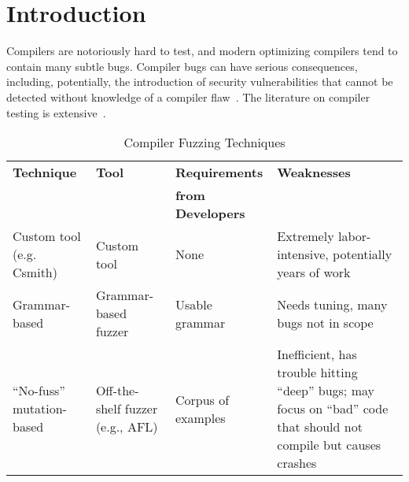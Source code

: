 \section{Introduction}

Compilers are notoriously hard to test, and modern optimizing
compilers tend to contain many subtle bugs.  Compiler bugs can have
serious consequences, including, potentially, the introduction of
security vulnerabilities that cannot be detected without knowledge of a compiler flaw~\cite{CompBug}.   The
literature on compiler testing is extensive~\cite{chen2020survey}.

\small
\begin{table*}
\centering
\begin{tabular}{p{35mm}p{31mm}p{30mm}p{67mm}}
\toprule
\bf Technique & \bf Tool & \bf Requirements    & \bf Weaknesses \\
              &          & \bf from Developers &                \\
\rowcolor{LLGray}
Custom tool (e.g. Csmith)  
& Custom tool 
& None 
& Extremely labor-intensive, potentially years of work
\\
Grammar-based              
& Grammar-based fuzzer             
& Usable grammar 
& Needs tuning, many bugs not in scope 
\\
\rowcolor{LLGray}
``No-fuss'' mutation-based 
& Off-the-shelf fuzzer \newline (e.g., AFL) 
& Corpus of examples 
& Inefficient, has trouble hitting ``deep'' bugs; may focus on ``bad'' code that should not compile but causes crashes 
  \\
\bottomrule
\end{tabular}
\caption{Compiler Fuzzing Techniques}
\label{tab:techniques}
\end{table*}
\normalsize

